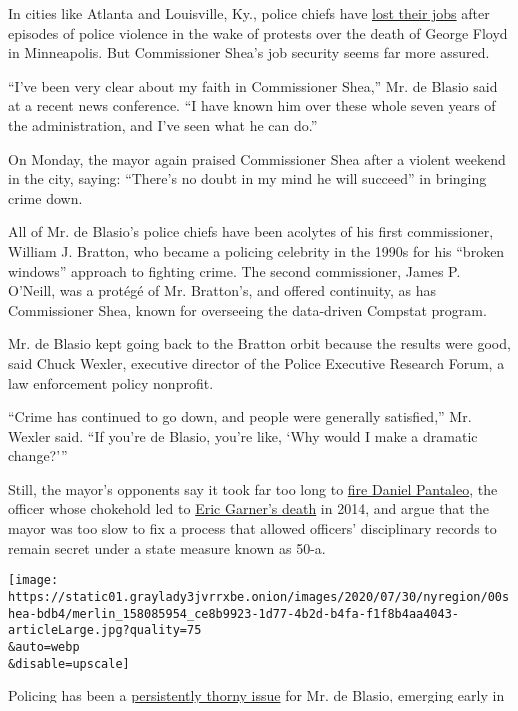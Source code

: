 In cities like Atlanta and Louisville, Ky., police chiefs have
\href{https://www.nytimes3xbfgragh.onion/2020/06/15/us/police-chiefs-fatal-shooting-atlanta.html}{lost
their jobs} after episodes of police violence in the wake of protests
over the death of George Floyd in Minneapolis. But Commissioner Shea's
job security seems far more assured.

``I've been very clear about my faith in Commissioner Shea,'' Mr. de
Blasio said at a recent news conference. ``I have known him over these
whole seven years of the administration, and I've seen what he can do.''

On Monday, the mayor again praised Commissioner Shea after a violent
weekend in the city, saying: ``There's no doubt in my mind he will
succeed'' in bringing crime down.

All of Mr. de Blasio's police chiefs have been acolytes of his first
commissioner, William J. Bratton, who became a policing celebrity in the
1990s for his ``broken windows'' approach to fighting crime. The second
commissioner, James P. O'Neill, was a protégé of Mr. Bratton's, and
offered continuity, as has Commissioner Shea, known for overseeing the
data-driven Compstat program.

Mr. de Blasio kept going back to the Bratton orbit because the results
were good, said Chuck Wexler, executive director of the Police Executive
Research Forum, a law enforcement policy nonprofit.

``Crime has continued to go down, and people were generally satisfied,''
Mr. Wexler said. ``If you're de Blasio, you're like, `Why would I make a
dramatic change?'''

Still, the mayor's opponents say it took far too long to
\href{https://www.nytimes3xbfgragh.onion/2019/08/19/nyregion/daniel-pantaleo-fired.html}{fire
Daniel Pantaleo}, the officer whose chokehold led to
\href{https://www.nytimes3xbfgragh.onion/2015/06/14/nyregion/eric-garner-police-chokehold-staten-island.html}{Eric
Garner's death} in 2014, and argue that the mayor was too slow to fix a
process that allowed officers' disciplinary records to remain secret
under a state measure known as 50-a.

\texttt{[image: https://static01.graylady3jvrrxbe.onion/images/2020/07/30/nyregion/00shea-bdb4/merlin\_158085954\_ce8b9923-1d77-4b2d-b4fa-f1f8b4aa4043-articleLarge.jpg?quality=75\\\&auto=webp\\\&disable=upscale]}

Policing has been a
\href{https://www.nytimes3xbfgragh.onion/2015/01/12/nyregion/in-police-rift-mayor-de-blasios-missteps-included-thinking-it-would-pass.html}{persistently
thorny issue} for Mr. de Blasio, emerging early in his tenure. His
election in 2013 was fueled in part by his opposition to the
stop-and-frisk policies under Mayor Michael R. Bloomberg, along with a
television ad starring Mr. de Blasio's son, Dante, who is Black and
pledged that his father would end the discriminatory policing practice.


